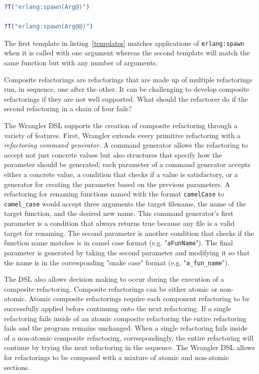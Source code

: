 \begin{lstlisting}[caption={Some Wrangler templates},language=erlang,label=templates]
?T("erlang:spawn(Arg@)")

?T("erlang:spawn(Arg@@)")
\end{lstlisting}

The first template in listing~\ref{templates} matches applications of \texttt{erlang:spawn} when it is called with one argument whereas the second template will match the same function but with any number of arguments.

Composite refactorings are refactorings that are made up of multiple refactorings run, in sequence, one after the other. It can be challenging to develop composite refactorings if they are not well supported. What should the refactorer do if the second refactoring in a chain of four fails? 

The Wrangler DSL supports the creation of composite refactoring through a variety of features. First, Wrangler extends every primitive refactoring with a \textit{refactoring command generator}. A command generator allows the refactoring to accept not just concrete values but also structures that specify how the parameter should be generated; each parameter of a command generator accepts either a concrete value, a condition that checks if a value is satisfactory, or a generator for creating the parameter based on the previous parameters. A refactoring for renaming functions named with the format \texttt{camelCase} to \texttt{camel\_case} would accept three arguments the target filename, the name of the target function, and the desired new name. This command generator's first parameter is a condition that always returns true because any file is a valid target for renaming. The second parameter is another condition that checks if the function name matches is in camel case format (e.g. "\texttt{aFunName}"). The final parameter is generated by taking the second parameter and modifying it so that the name is in the corresponding "snake case" format (e.g. "\texttt{a\_fun\_name}"). 

The DSL also allows decision making to occur during the execution of a composite refactoring. Composite refactorings can be either atomic or non-atomic. Atomic composite refactorings require each component refactoring to be successfully applied before continuing onto the next refactoring. If a single refactoring fails inside of an atomic composite refactoring the entire refactoring fails and the program remains unchanged. When a single refactoring fails inside of a non-atomic composite refactoring, correspondingly, the entire refactoring will continue by trying the next refactoring in the sequence. The Wrangler DSL allows for refactorings to be composed with a mixture of atomic and non-atomic sections.  


